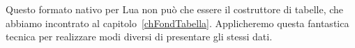 Questo formato nativo per Lua non può che essere il costruttore di tabelle, che
abbiamo incontrato al capitolo~\ref{chFondTabella}. Applicheremo questa fantastica
tecnica per realizzare modi diversi di presentare gli stessi dati.













